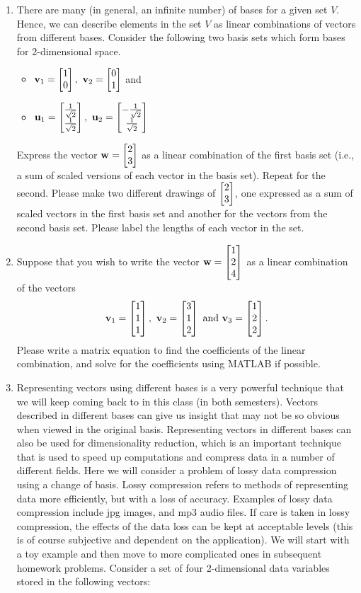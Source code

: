 \begin{prob}
\begin{enumerate}
\item There are many (in general, an infinite number) of bases for a given set $V$. Hence, we can describe elements in the set $V$ as linear combinations of vectors from different bases. Consider the following two basis sets which form bases for 2-dimensional space.
   \begin{itemize}
       \item
        $\mathbf{v}_1 = \twobyone{1}{0}, \ \mathbf{v}_2 = \twobyone{0}{1}$  and
    \item
        $\mathbf{u}_1 = \begin{bmatrix} \frac{1}{\sqrt{2}} \\ \frac{1}{\sqrt{2}} \end{bmatrix}, \ \mathbf{u}_2 = \begin{bmatrix} -\frac{1}{\sqrt{2}} \\ \frac{1}{\sqrt{2}} \end{bmatrix}$
    \end{itemize}

    Express the vector $\mathbf{w} = \begin{bmatrix} 2 \\ 3 \end{bmatrix}$ as a linear combination of the first basis set (i.e., a sum of scaled versions of each vector in the basis set). Repeat for the second. Please make two different drawings of $\begin{bmatrix} 2 \\ 3 \end{bmatrix}$, one expressed as a sum of scaled vectors in the first basis set and another for the vectors from the second basis set. Please label the lengths of each vector in the set.


\item Suppose that you wish to write the vector $\mathbf{w} =\begin{bmatrix} 1 \\ 2 \\ 4 \end{bmatrix}$ as a linear combination of the vectors
$$\mathbf{v}_1 =\threebyone{1}{1}{1}, \ \mathbf{v}_2=\threebyone{3}{1}{2} \text{ and } \mathbf{v}_3=\threebyone{1}{2}{2}.$$
 Please write a matrix equation to find the coefficients of the linear combination, and solve for the coefficients using MATLAB if possible.



\item Representing vectors using different bases is a very powerful technique that we will keep coming back to in this class (in both semesters). Vectors described in different bases can give us insight that may not be so obvious when viewed in the original basis.  Representing vectors in different bases can also be used for dimensionality reduction, which is an important technique that is used to speed up computations and compress data in a number of different fields. Here we will consider a problem of lossy data compression using a change of basis. Lossy compression refers to methods of representing data more efficiently, but with a loss of accuracy. Examples of lossy data compression include jpg images, and mp3 audio files.     If care is taken in lossy compression, the effects of the data loss can be kept at acceptable levels (this is of course subjective and dependent on the application). We will start with a toy example and then move to  more complicated ones in subsequent homework problems.
    Consider a set of four 2-dimensional data variables stored in the following vectors:




\end{enumerate}
\end{prob}
